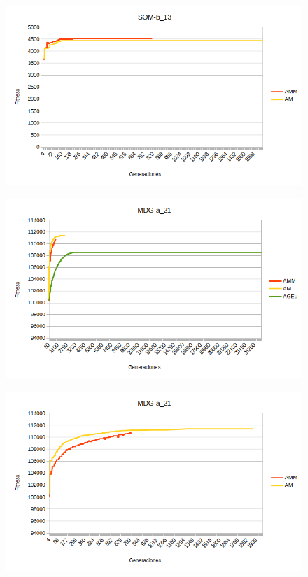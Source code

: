 \documentclass[11pt,a4paper]{article}
\begin{document}
	\begin{figure}[H] 
		\centering
		\includegraphics[scale=0.9]{../output/exp3/SOM2}
	\end{figure}
	
	\begin{figure}[H] 
		\centering
		\includegraphics[scale=1]{../output/exp3/MDG1}
	\end{figure}
	
	\begin{figure}[H] 
		\centering
		\includegraphics[scale=1]{../output/exp3/MDG2}
	\end{figure}
\end{document}
